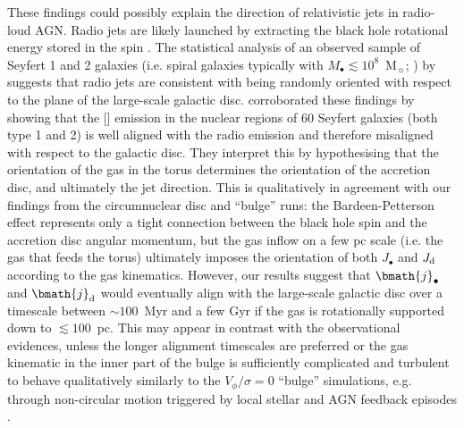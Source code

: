 \documentclass[a4paper,fleqn,usenatbib]{mnras}
\begin{document}
These findings could possibly explain the direction of relativistic jets in radio-loud AGN.
Radio jets are likely launched by extracting the black hole rotational energy stored in the spin \citep{blandford+77,tchekhovskoy+11}.
The statistical analysis of an observed sample of Seyfert 1 and 2 galaxies (i.e. spiral galaxies typically with $M_{\bullet} \lesssim 10^{8}$~M$_{\sun}$; \citealt{onken+03, komossa+07}) by \citet{kinney+00} suggests that radio jets are consistent with being randomly oriented with respect to the plane of the large-scale galactic disc.
\citet{schmitt+03} corroborated these findings by showing that the [] emission in the nuclear regions of 60 Seyfert galaxies (both type 1 and 2) is well aligned with the radio emission and therefore misaligned with respect to the galactic disc.
They interpret this by hypothesising that the orientation of the gas in the torus determines the orientation of the accretion disc, and ultimately the jet direction.
This is qualitatively in agreement with our findings from the circumnuclear disc and ``bulge'' runs: the Bardeen-Petterson effect represents only a tight connection between the black hole spin and the accretion disc angular momentum, but the gas inflow on a few pc scale (i.e. the gas that feeds the torus) ultimately imposes the orientation of both $J_{\bullet}$ and $J_{\rm d}$ according to the gas kinematics.
However, our results suggest that $\bmath{j}_{\bullet}$ and $\bmath{j}_{\rm d}$ would eventually align with the large-scale galactic disc over a timescale between $\sim 100$~Myr and a few Gyr if the gas is rotationally supported down to $\lesssim 100$~pc.
This may appear in contrast with the observational evidences, unless the longer alignment timescales are preferred or the gas kinematic in the inner part of the bulge is sufficiently complicated and turbulent to behave qualitatively similarly to the $V_{\phi}/\sigma = 0$ ``bulge'' simulations, e.g. through non-circular motion triggered by local stellar and AGN feedback episodes \citep{riffel+08,lena+15}. 
\end{document}
